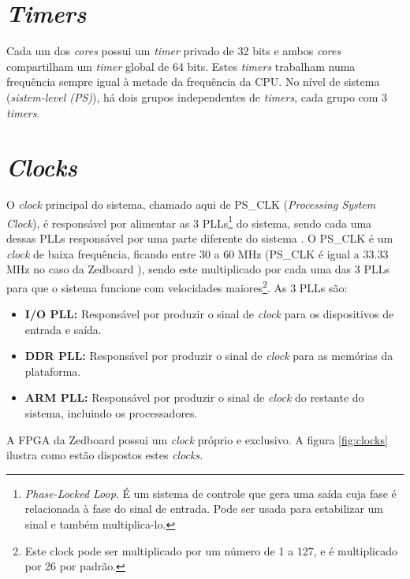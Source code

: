

\section{\emph{Timers}}
Cada um dos \emph{cores} possui um \emph{timer} privado de 32 bits e ambos \emph{cores} compartilham um \emph{timer} global de 64 bits. Estes \emph{timers} trabalham numa frequência sempre igual à metade da frequência da CPU.
No nível de sistema (\emph{sistem-level (PS)}), há dois grupos independentes de \emph{timers}, cada grupo com 3 \emph{timers}.


\section{\emph{Clocks}}

O \emph{clock} principal do sistema, chamado aqui de PS\_CLK (\emph{Processing System Clock}), é responsável por alimentar as 3 PLLs\footnote{\emph{Phase-Locked Loop}. É um sistema de controle que gera uma saída cuja fase é relacionada à fase do sinal de entrada. Pode ser usada para estabilizar um sinal e também multiplica-lo.} do sistema, sendo cada uma dessas PLLs responsável por uma parte diferente do sistema \cite[p.~622]{ug585}. O PS\_CLK é um \emph{clock} de baixa frequência, ficando entre 30 a 60 MHz (PS\_CLK é igual a 33.33 MHz no caso da Zedboard \cite[p.~19]{zed_manual}), sendo este multiplicado por cada uma das 3 PLLs para que o sistema funcione com velocidades maiores\footnote{Este clock pode ser multiplicado por um número de 1 a 127, e é multiplicado por 26 por padrão.}. As 3 PLLs são:

\begin{itemize}
	\item \textbf{I/O PLL:} Responsável por produzir o sinal de \emph{clock} para os dispositivos de entrada e saída.
	\item \textbf{DDR PLL:} Responsável por produzir o sinal de \emph{clock} para as memórias da plataforma.
	\item \textbf{ARM PLL:} Responsável por produzir o sinal de \emph{clock} do restante do sistema, incluindo os processadores.
\end{itemize}

A FPGA da Zedboard possui um \emph{clock} próprio e exclusivo. A figura \ref{fig:clocks} ilustra como estão dispostos estes \emph{clocks}.

